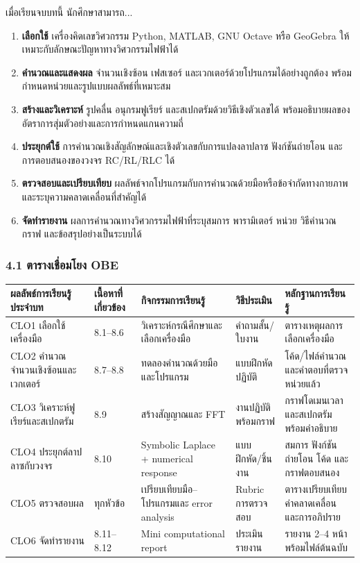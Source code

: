 เมื่อเรียนจบบทนี้ นักศึกษาสามารถ...

\begin{enumerate}
    \item \textbf{เลือกใช้} เครื่องคิดเลขวิศวกรรม Python, MATLAB, GNU Octave หรือ GeoGebra ให้เหมาะกับลักษณะปัญหาทางวิศวกรรมไฟฟ้าได้
    \item \textbf{คำนวณและแสดงผล} จำนวนเชิงซ้อน เฟสเซอร์ และเวกเตอร์ด้วยโปรแกรมได้อย่างถูกต้อง พร้อมกำหนดหน่วยและรูปแบบผลลัพธ์ที่เหมาะสม
    \item \textbf{สร้างและวิเคราะห์} รูปคลื่น อนุกรมฟูเรียร์ และสเปกตรัมด้วยวิธีเชิงตัวเลขได้ พร้อมอธิบายผลของอัตราการสุ่มตัวอย่างและการกำหนดแกนความถี่
    \item \textbf{ประยุกต์ใช้} การคำนวณเชิงสัญลักษณ์และเชิงตัวเลขกับการแปลงลาปลาซ ฟังก์ชันถ่ายโอน และการตอบสนองของวงจร RC/RL/RLC ได้
    \item \textbf{ตรวจสอบและเปรียบเทียบ} ผลลัพธ์จากโปรแกรมกับการคำนวณด้วยมือหรือข้อจำกัดทางกายภาพ และระบุความคลาดเคลื่อนที่สำคัญได้
    \item \textbf{จัดทำรายงาน} ผลการคำนวณทางวิศวกรรมไฟฟ้าที่ระบุสมการ พารามิเตอร์ หน่วย วิธีคำนวณ กราฟ และข้อสรุปอย่างเป็นระบบได้
\end{enumerate}

\subsubsection{4.1 ตารางเชื่อมโยง OBE}

\begin{table}[htbp]
    \centering
    \begin{tabular}{l l l l l}
        \hline
        \textbf{ผลลัพธ์การเรียนรู้ประจำบท} & \textbf{เนื้อหาที่เกี่ยวข้อง} & \textbf{กิจกรรมการเรียนรู้} & \textbf{วิธีประเมิน} & \textbf{หลักฐานการเรียนรู้} \\
        \hline
        CLO1 เลือกใช้เครื่องมือ & 8.1–8.6 & วิเคราะห์กรณีศึกษาและเลือกเครื่องมือ & คำถามสั้น/ใบงาน & ตารางเหตุผลการเลือกเครื่องมือ \\
        CLO2 คำนวณจำนวนเชิงซ้อนและเวกเตอร์ & 8.7–8.8 & ทดลองคำนวณด้วยมือและโปรแกรม & แบบฝึกหัดปฏิบัติ & โค้ด/ไฟล์คำนวณและคำตอบที่ตรวจหน่วยแล้ว \\
        CLO3 วิเคราะห์ฟูเรียร์และสเปกตรัม & 8.9 & สร้างสัญญาณและ FFT & งานปฏิบัติพร้อมกราฟ & กราฟโดเมนเวลาและสเปกตรัมพร้อมคำอธิบาย \\
        CLO4 ประยุกต์ลาปลาซกับวงจร & 8.10 & Symbolic Laplace + numerical response & แบบฝึกหัด/ชิ้นงาน & สมการ ฟังก์ชันถ่ายโอน โค้ด และกราฟตอบสนอง \\
        CLO5 ตรวจสอบผล & ทุกหัวข้อ & เปรียบเทียบมือ–โปรแกรมและ error analysis & Rubric การตรวจสอบ & ตารางเปรียบเทียบ ค่าคลาดเคลื่อน และการอภิปราย \\
        CLO6 จัดทำรายงาน & 8.11–8.12 & Mini computational report & ประเมินรายงาน & รายงาน 2–4 หน้า พร้อมไฟล์ต้นฉบับ \\
        \hline
    \end{tabular}
\end{table}

